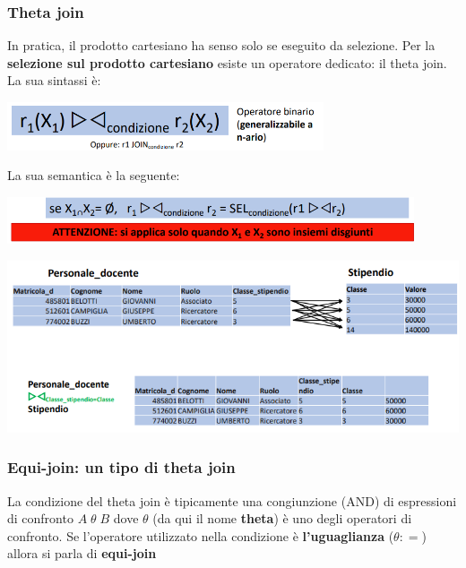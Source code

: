 \documentclass[12pt]{article}
\begin{document}
\subsubsection{Theta join}
In pratica, il prodotto cartesiano ha senso solo se eseguito da selezione.
Per la \textbf{selezione sul prodotto cartesiano} esiste un operatore dedicato: il theta join.
La sua sintassi è:
\begin{center}
    \includegraphics[width =0.70\textwidth]{Images/145.PNG}
\end{center} 
La sua semantica è la seguente:
\begin{center}
    \includegraphics[width =0.90\textwidth]{Images/146.PNG}
\end{center} 
\begin{center}
    \includegraphics[width =1\textwidth]{Images/147.PNG}
\end{center} 
\subsubsection{Equi-join: un tipo di theta join}
La condizione del theta join è tipicamente una congiunzione (AND) di espressioni di confronto $A \; \theta \; B$ dove $\theta$ (da qui il nome \textbf{theta}) è uno degli operatori di confronto.
Se l'operatore utilizzato nella condizione è \textbf{l'uguaglianza} ($\theta : =$) allora si parla di \textbf{equi-join}
\end{document}
